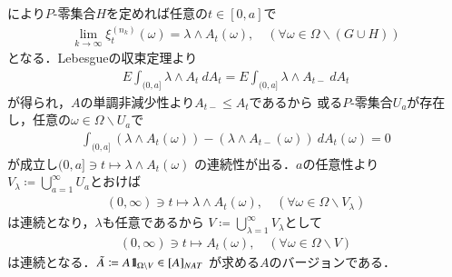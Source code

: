 \begin{prf}
\begin{description}
				により$P$-零集合$H$を定めれば任意の$t \in [0,a]$で
				\begin{align}
					\lim_{k \to \infty} \xi^{(n_k)}_t(\omega) = \lambda \wedge A_t(\omega),
					\quad (\forall \omega \in \Omega \backslash (G \cup H))
				\end{align}
				となる．Lebesgueの収束定理より
				\begin{align}
					E\int_{(0,a]} \lambda \wedge A_t\ dA_t
					= E\int_{(0,a]} \lambda \wedge A_{t-}\ dA_t
				\end{align}
				が得られ，$A$の単調非減少性より$A_{t-} \leq A_t$であるから
				或る$P$-零集合$U_a$が存在し，任意の$\omega \in \Omega \backslash U_a$で
				\begin{align}
					\int_{(0,a]} (\lambda \wedge A_t(\omega)) 
					- (\lambda \wedge A_{t-}(\omega))\ dA_t(\omega) = 0
				\end{align}
				が成立し$(0,a] \ni t \longmapsto \lambda \wedge A_t(\omega)$
				の連続性が出る．$a$の任意性より
				$V_\lambda \coloneqq \bigcup_{a=1}^\infty U_a$とおけば
				\begin{align}
					(0,\infty) \ni t \longmapsto \lambda \wedge A_t(\omega),
					 \quad (\forall \omega \in \Omega \backslash V_\lambda)
				\end{align}
				は連続となり，$\lambda$も任意であるから
				$V \coloneqq \bigcup_{\lambda=1}^\infty V_\lambda$として
				\begin{align}
					(0,\infty) \ni t \longmapsto A_t(\omega),
					\quad (\forall \omega \in \Omega \backslash V)
				\end{align}
				は連続となる．$\tilde{A} \coloneqq A \mbox{1}\hspace{-0.25em}\mbox{l}_{\Omega \backslash V} \in [A]_{NAT}$
				が求める$A$のバージョンである．
				\QED
		\end{description}
	\end{prf}
